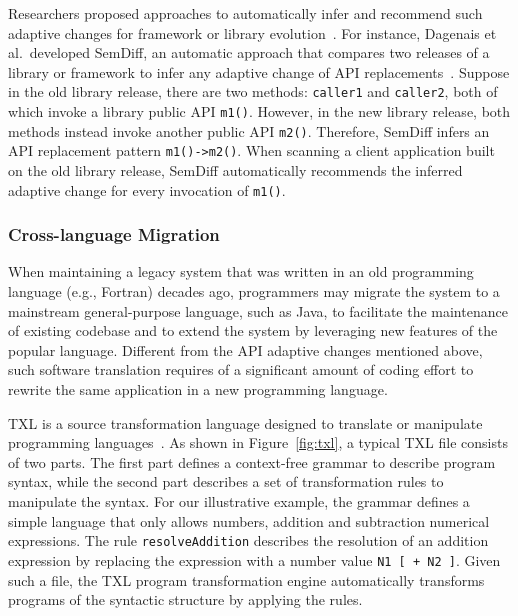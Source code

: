 \documentclass[runningheads,a4paper]{llncs}
\newcommand{\codefont}[1]{\footnotesize{\texttt{#1}}\normalsize}
\begin{document}
Researchers proposed approaches to automatically infer and recommend such adaptive changes for framework or library evolution~\cite{Dagenais2008:RAC,Schafer2008:MFU,Zhong2009:MMR,Wu2010:AHA,Nguyen2010:GAA}. For instance, Dagenais et al.~developed SemDiff, an automatic approach that compares two releases of a library or framework to infer any adaptive change of API replacements~\cite{Dagenais2008:RAC}. 
Suppose in the old library release, there are two methods: \codefont{caller1} and \codefont{caller2}, both of which invoke a library public API \codefont{m1()}. However, in the new library release, both methods instead invoke another public API \codefont{m2()}. Therefore, SemDiff infers an API replacement pattern \codefont{m1()->m2()}. When scanning a client application built on the old library release, SemDiff automatically recommends the inferred adaptive change for every invocation of \codefont{m1()}.

\subsubsection{Cross-language Migration} 
When maintaining a legacy system that was written in an old programming language (e.g., Fortran) decades ago, programmers may migrate the system to a mainstream general-purpose language, such as Java, to facilitate the maintenance of existing codebase and to extend the system by leveraging new features of the popular language. Different from the API adaptive changes mentioned above, such software translation requires of a significant amount of coding effort to rewrite the same application in a new programming language.


TXL is a source transformation language designed to translate or manipulate programming languages~\cite{Cordy2006}. As shown in Figure~\ref{fig:txl}, a typical TXL file consists of two parts. The first part defines a context-free grammar to describe program syntax, while the second part describes a set of transformation rules to manipulate the syntax. For our illustrative example, the grammar defines a simple language that only allows numbers, addition and subtraction numerical expressions. The rule \codefont{resolveAddition} describes the resolution of an addition expression by replacing the expression with a number value \codefont{N1 [ + N2 ]}. Given such a file, the TXL program transformation engine automatically transforms programs of the syntactic structure by applying the rules. 
\end{document}
